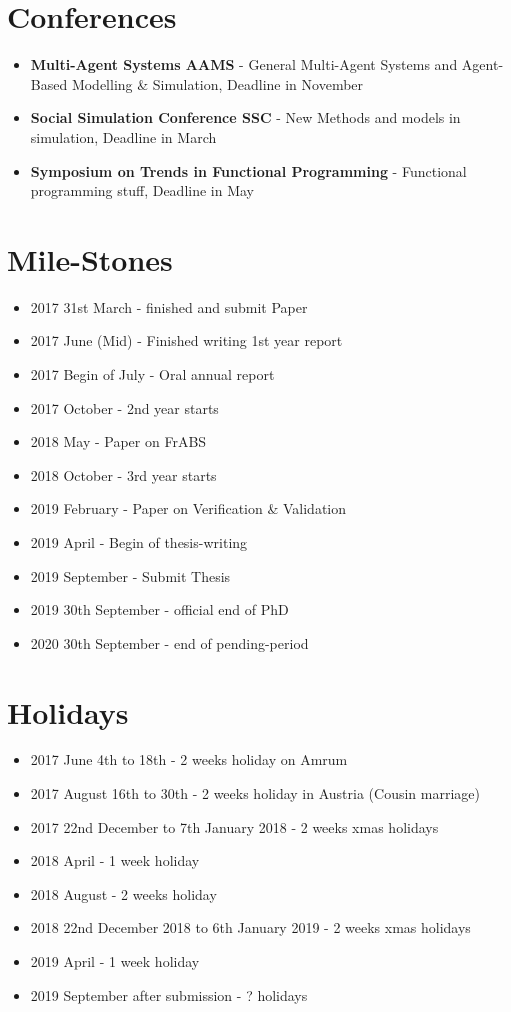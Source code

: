 \section{Conferences}
\begin{itemize}
	\item \textbf{Multi-Agent Systems AAMS} - General Multi-Agent Systems and Agent-Based Modelling \& Simulation, Deadline in November
	\item \textbf{Social Simulation Conference SSC} - New Methods and models in simulation, Deadline in March
	\item \textbf{Symposium on Trends in Functional Programming} - Functional programming stuff, Deadline in May
\end{itemize}

\section{Mile-Stones}
\begin{itemize}
	\item 2017 31st March - finished and submit Paper 
	\item 2017 June (Mid) - Finished writing 1st year report 
	\item 2017 Begin of July - Oral annual report
	\item 2017 October - 2nd year starts
	\item 2018 May - Paper on FrABS
	\item 2018 October - 3rd year starts
	\item 2019 February - Paper on Verification \& Validation
	\item 2019 April - Begin of thesis-writing
	\item 2019 September - Submit Thesis
	\item 2019 30th September - official end of PhD
	\item 2020 30th September - end of pending-period
\end{itemize}

\section{Holidays}
\begin{itemize}
	\item 2017 June 4th to 18th - 2 weeks holiday on Amrum 
	\item 2017 August 16th to 30th - 2 weeks holiday in Austria (Cousin marriage)
	\item 2017 22nd December to 7th January 2018 - 2 weeks xmas holidays
	\item 2018 April - 1 week holiday
	\item 2018 August - 2 weeks holiday
	\item 2018 22nd December 2018 to 6th January 2019 - 2 weeks xmas holidays
	\item 2019 April - 1 week holiday
	\item 2019 September after submission - ? holidays
\end{itemize}